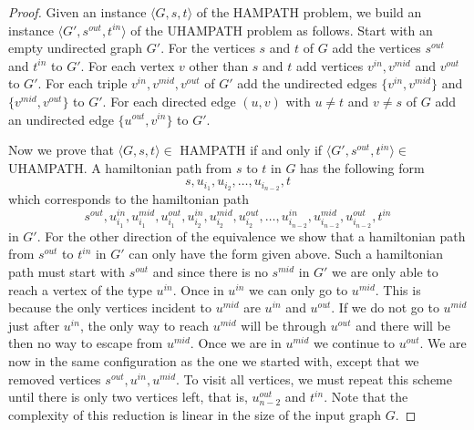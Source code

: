 \documentclass{article}
\begin{document}
\begin{proof}
	Given an instance \(\langle G, s, t \rangle\) of the HAMPATH problem, we
	build an instance \(\langle G', s^{out}, t^{in}\rangle\) of the UHAMPATH
	problem as follows. Start with an empty undirected graph \(G'\). For the
	vertices \(s\) and \(t\) of \(G\) add the vertices \(s^{out}\) and
	\(t^{in}\) to \(G'\). For each vertex \(v\) other than \(s\) and \(t\) add
	vertices \(v^{in}, v^{mid}\) and \(v^{out}\) to \(G'\). For each triple
	\(v^{in},v^{mid},v^{out}\) of \(G'\) add the undirected edges \(\{v^{in},
	v^{mid}\}\) and \(\{v^{mid},v^{out}\}\) to \(G'\).
	For each directed
	edge \((u,v)\) with \(u \neq t\) and \(v \neq s\) of \(G\) add an
	undirected
	edge \(\{u^{out},v^{in}\}\) to \(G'\).

	Now we prove that \(\langle G, s, t \rangle \in\) HAMPATH if and only if
	\(\langle G', s^{out}, t^{in}\rangle \in\) UHAMPATH. A hamiltonian path from \(s\) to
	\(t\) in \(G\) has the following form
	\begin{displaymath}
		s, u_{i_1}, u_{i_2}, \ldots, u_{i_{n-2}}, t
	\end{displaymath}
	which corresponds to the hamiltonian path
	\begin{displaymath}
		s^{out}, u^{in}_{i_1}, u^{mid}_{i_1}, u^{out}_{i_1}, u^{in}_{i_2},
		u^{mid}_{i_2}, u^{out}_{i_2}, \ldots, u^{in}_{i_{n-2}}, u^{mid}_{i_{n-2}},
		u^{out}_{i_{n-2}}, t^{in}
	\end{displaymath}
	in \(G'\). For the other direction of the equivalence we show that a
	hamiltonian path from \(s^{out}\) to \(t^{in}\) in \(G'\) can only have the
	form given above. Such a hamiltonian path must start with \(s^{out}\) and
	since there is no \(s^{mid}\) in \(G'\) we are only able to reach a vertex
	of the type \(u^{in}\). Once in \(u^{in}\) we can only go to \(u^{mid}\).
	This is because the only vertices incident to \(u^{mid}\) are \(u^{in}\) and
	\(u^{out}\). If we do not go to \(u^{mid}\) just after \(u^{in}\),
	the only way to reach \(u^{mid}\) will be through \(u^{out}\) and there
	will be then no way to escape from \(u^{mid}\). Once we are in \(u^{mid}\)
	we continue to \(u^{out}\). We are now in the same configuration as the one
	we started with, except that we removed vertices
	\(s^{out},u^{in},u^{mid}\). To visit all vertices, we must repeat this
	scheme until there is only two vertices left, that is, \(u^{out}_{n-2}\)
	and \(t^{in}\). Note that the complexity of this reduction is linear in the
	size of the input graph \(G\).
\end{proof}
\end{document}

